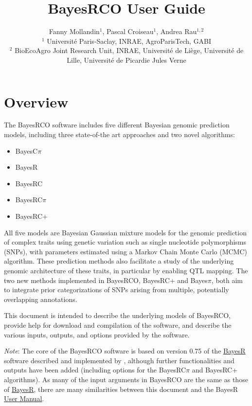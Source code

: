 \documentclass{ol-softwaremanual}
\title{BayesRCO User Guide
}
\author{Fanny Mollandin$^{1}$, Pascal Croiseau$^{1}$, Andrea Rau$^{1,2}$\\ \vspace*{.5cm}
{\footnotesize
$^{1}$ Université Paris-Saclay, INRAE, AgroParisTech, GABI\\
$^{2}$ BioEcoAgro Joint Research Unit, INRAE, Université de Liège, Université de Lille, Université de Picardie Jules Verne\\ \vspace*{.5cm}
}}
\begin{document}
\maketitle

\tableofcontents
\newpage

\section{Overview}
The BayesRCO software includes five different Bayesian genomic prediction models, including three state-of-the art approaches and two novel algorithms:

\begin{itemize}
    \item BayesC$\pi$ \citep{habier_extension_2011}
    \item BayesR \citep{erbe_improving_2012}
    \item BayesRC \citep{macleod_exploiting_2016}
    \item BayesRC$\pi$
    \item BayesRC+
\end{itemize}  

All five models are Bayesian Gaussian mixture models for the genomic prediction of complex traits using genetic variation such as single nucleotide polymorphisms (SNPs), with parameters estimated using a Markov Chain Monte Carlo (MCMC) algorithm. These prediction methods also facilitate a study of the underlying genomic architecture of these traits, in particular by enabling QTL mapping. The two new methods implemented in BayesRCO, BayesRC+ and Bayes$\pi$, both aim to integrate prior categorizations of SNPs arising from multiple, potentially overlapping annotations. 

This document is intended to describe the underlying models of BayesRCO, provide help for download and compilation of the software, and describe the various inputs, outputs, and options provided by the software.
\vspace*{.5cm}

\begin{tcolorbox}
{\it Note}: The core of the BayesRCO software is based on version 0.75 of the \href{https://github.com/syntheke/bayesR/tree/master/old}{BayesR} software described and implemented by \citet{moser_simultaneous_2015}, although further functionalities and outputs have been added (including options for the BayesRC$\pi$ and BayesRC+ algorithms). As many of the input arguments in BayesRCO are the same as those of \href{https://github.com/syntheke/bayesR/tree/master/old}{BayesR}, there are many similarities between this document and the BayesR \href{https://github.com/syntheke/bayesR/blob/master/old/doc/BayesRmanual-0.75.pdf}{User Manual}.
\end{tcolorbox}
\end{document}
